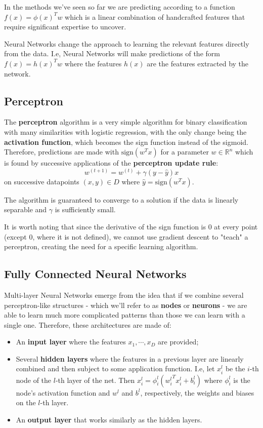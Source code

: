 \documentclass{article}
\newcommand{\R}{\mathbb{R}}
\begin{document}
In the methods we've seen so far we are predicting according to a function $f(x) = \phi(x)^T w$ which is a linear combination of handcrafted features that require significant expertise to uncover.

Neural Networks change the approach to learning the relevant features directly from the data.
I.e, Neural Networks will make predictions of the form $f(x) = h(x)^T w$ where the features $h(x)$ are the features extracted by the network.

\subsection{Perceptron}

The \textbf{perceptron} algorithm is a very simple algorithm for binary classification with many similarities with logistic regression, with the only change being the \textbf{activation function}, which becomes the sign function instead of the sigmoid.
Therefore, predictions are made with $\text{sign}(w^T x)$ for a parameter $w \in \R^n$ which is found by successive applications of the \textbf{perceptron update rule}:
$$
w^{(t+1)} = w^{(t)} + \gamma (y - \hat{y}) x
$$
on successive datapoints $(x,y) \in D$ where $\hat{y} = \text{sign}(w^T x)$.

The algorithm is guaranteed to converge to a solution if the data is linearly separable and $\gamma$ is sufficiently small.

It is worth noting that since the derivative of the sign function is 0 at every point (except 0, where it is not defined), we cannot use gradient descent to "teach" a perceptron, creating the need for a specific learning algorithm.

\subsection{Fully Connected Neural Networks}

Multi-layer Neural Networks emerge from the idea that if we combine several perceptron-like structures - which we'll refer to as \textbf{nodes} or \textbf{neurons} - we are able to learn much more complicated patterns than those we can learn with a single one.
Therefore, these architectures are made of:
\begin{itemize}
    \item An \textbf{input layer} where the features $x_1, \cdots, x_D$ are provided;
    \item Several \textbf{hidden layers} where the features in a previous layer are linearly combined and then subject to some application function.
	I.e, let $x^l_i$ be the $i$-th node of the $l$-th layer of the net. Then
	$x^l_i = \phi^l_i({w^l_i}^T x^l_i + b^l_i)$
	where $\phi^l_i$ is the node's activation function and $w^l$ and $b^l$, respectively, the weights and biases on the $l$-th layer.
    \item An \textbf{output layer} that works similarly as the hidden layers.
\end{itemize}
\end{document}
